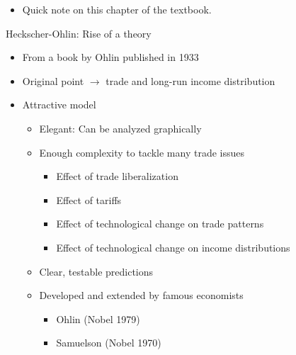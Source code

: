 \documentclass[ignorenonframetext,]{beamer}
\begin{document}
\begin{frame}
\begin{itemize}
    \item Quick note on this chapter of the textbook.
\end{itemize}

\end{frame}
\begin{frame}{Heckscher-Ohlin: Rise of a theory}

    \begin{itemize}
        \item From a book by Ohlin published in 1933 
        \item Original point $\rightarrow$ trade and long-run income distribution
        \item Attractive model
        \begin{itemize}
            \item Elegant: Can be analyzed graphically
            \item Enough complexity to tackle many trade issues
            \begin{itemize}
                \item Effect of trade liberalization
                \item Effect of tariffs
                \item Effect of technological change on trade patterns
                \item Effect of technological change on income distributions 
            \end{itemize}
            \item Clear, testable predictions
            \item Developed and extended by famous economists
            \begin{itemize}
                \item Ohlin (Nobel 1979)
                \item Samuelson (Nobel 1970)
            \end{itemize}
        \end{itemize}
    \end{itemize}

\end{frame}
\end{document}
